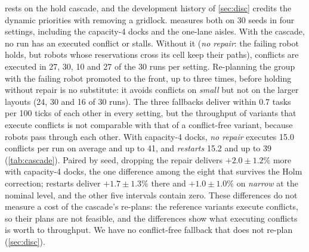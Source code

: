  rests on the hold cascade, and the development history of
\cref{sec:disc} credits the dynamic priorities with removing a gridlock.
 measures both on 30 seeds in four settings, including the
capacity-4 docks and the one-lane aisles. With the cascade, no run has an
executed conflict or stalls. Without it (\emph{no repair}: the failing robot
holds, but robots whose reservations cross its cell keep their paths),
conflicts are executed in 27, 30, 10 and 27 of the 30 runs per setting.
Re-planning the group with the failing robot promoted to the front, up to
three times, before holding without repair is no substitute: it avoids
conflicts on \emph{small} but not on the larger layouts (24, 30 and 16 of 30
runs). The three fallbacks deliver
within 0.7 tasks per 100 ticks of each other in every setting, but the
throughput of variants that execute conflicts is not comparable with that of a
conflict-free variant, because robots pass through each other. With capacity-4
docks, \emph{no repair} executes 15.0 conflicts per run on average and up to 41,
and \emph{restarts} 15.2 and up to 39 (\cref{tab:cascade}). Paired by seed,
dropping the repair delivers $+2.0\pm1.2\%$ more with capacity-4 docks, the one
difference among the eight that survives the Holm correction; restarts deliver
$+1.7\pm1.3\%$ there and $+1.0\pm1.0\%$ on \emph{narrow} at the nominal level, and the other five
intervals contain zero. These differences do not measure a cost of the cascade's
re-plans: the reference variants execute conflicts, so their plans are not
feasible, and the differences show what executing conflicts is worth to
throughput. We have no conflict-free fallback that does not re-plan
(\cref{sec:disc}).

